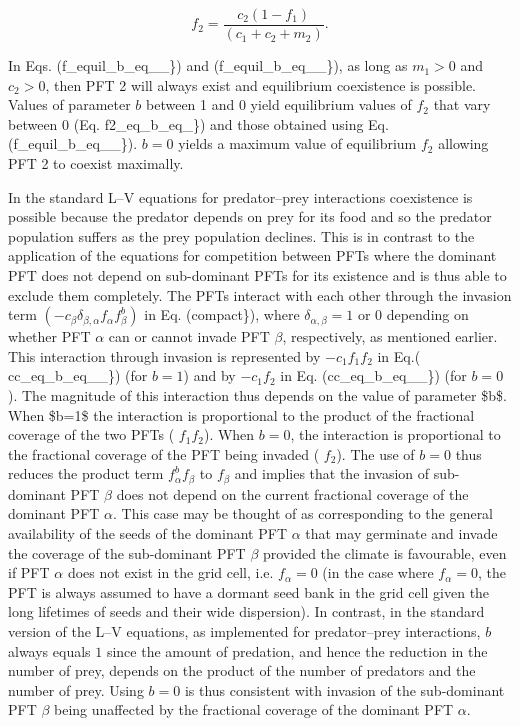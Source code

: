 \[ \label{f_equil_b_eq_0_2} f_2 = \frac{c_2(1 - f_1)}{(c_1 + c_2 + m_2)}. \]

In Eqs. (f\+\_\+equil\+\_\+b\+\_\+eq\+\_\+\_\}) and (f\+\_\+equil\+\_\+b\+\_\+eq\+\_\+\_\}), as long as $m_1> 0$ and $c_2 > 0$, then P\+F\+T 2 will always exist and equilibrium coexistence is possible. Values of parameter $b$ between 1 and 0 yield equilibrium values of $f_2$ that vary between 0 (Eq. f2\+\_\+eq\+\_\+b\+\_\+eq\+\_\}) and those obtained using Eq. (f\+\_\+equil\+\_\+b\+\_\+eq\+\_\+\_\}). $b=0$ yields a maximum value of equilibrium $f_2$ allowing P\+F\+T 2 to coexist maximally.

In the standard L--V equations for predator--prey interactions coexistence is possible because the predator depends on prey for its food and so the predator population suffers as the prey population declines. This is in contrast to the application of the equations for competition between P\+F\+Ts where the dominant P\+F\+T does not depend on sub-\/dominant P\+F\+Ts for its existence and is thus able to exclude them completely. The P\+F\+Ts interact with each other through the invasion term $(-c_{\beta} \delta_{\beta,\alpha} f_\alpha f^b_\beta)$ in Eq. (compact\}), where $\delta_{\alpha,\beta} = 1$ or $0$ depending on whether P\+F\+T $\alpha$ can or cannot invade P\+F\+T $\beta$, respectively, as mentioned earlier. This interaction through invasion is represented by $-c_1 f_1 f_2$ in Eq.( cc\+\_\+eq\+\_\+b\+\_\+eq\+\_\+\_\}) (for $b=1$) and by $-c_1 f_2$ in Eq. (cc\+\_\+eq\+\_\+b\+\_\+eq\+\_\+\_\}) (for $b=0$). The magnitude of this interaction thus depends on the value of parameter \$b\$. When \$b=1\$ the interaction is proportional to the product of the fractional coverage of the two P\+F\+Ts ( $f_1 f_2$). When $b=0$, the interaction is proportional to the fractional coverage of the P\+F\+T being invaded ( $f_2$). The use of $b=0$ thus reduces the product term $f_{\alpha}^b f_{\beta}$ to $f_\beta$ and implies that the invasion of sub-\/dominant P\+F\+T $\beta$ does not depend on the current fractional coverage of the dominant P\+F\+T $\alpha$. This case may be thought of as corresponding to the general availability of the seeds of the dominant P\+F\+T $\alpha$ that may germinate and invade the coverage of the sub-\/dominant P\+F\+T $\beta$ provided the climate is favourable, even if P\+F\+T $\alpha$ does not exist in the grid cell, i.\+e. $f_\alpha = 0$ (in the case where $f_\alpha = 0$, the P\+F\+T is always assumed to have a dormant seed bank in the grid cell given the long lifetimes of seeds and their wide dispersion). In contrast, in the standard version of the L--V equations, as implemented for predator--prey interactions, $b$ always equals $1$ since the amount of predation, and hence the reduction in the number of prey, depends on the product of the number of predators and the number of prey. Using $b=0$ is thus consistent with invasion of the sub-\/dominant P\+F\+T $\beta$ being unaffected by the fractional coverage of the dominant P\+F\+T $\alpha$.

